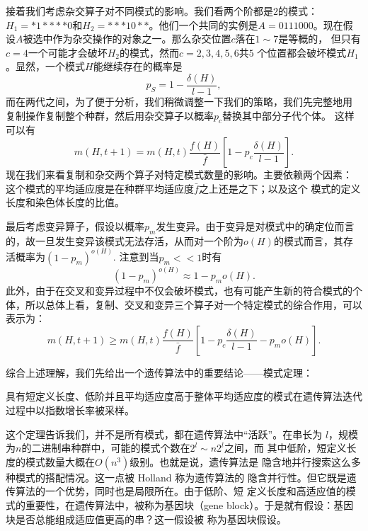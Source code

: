 接着我们考虑杂交算子对不同模式的影响。我们看两个阶都是$2$的模式：$H_1
= *1****0$和$H_2 = ***10**$。他们一个共同的实例是$A = 0111000$。现在假
设$A$被选中作为杂交操作的对象之一。那么杂交位置$c$落在$1 \sim 7$是等概的，
但只有$c = 4$一个可能才会破坏$H_2$的模式，然而$c = 2, 3, 4, 5, 6$共$5$
个位置都会破坏模式$H_1$。显然，一个模式$H$能继续存在的概率是
\begin{equation}
  p_S = 1 - \frac{\delta(H)}{l - 1},
  \label{eq::GA_ps}
\end{equation}
而在两代之间，为了便于分析，我们稍微调整一下我们的策略，我们先完整地用
复制操作复制整个种群，然后用杂交算子以概率$p_c$替换其中部分子代个体。
这样可以有
\begin{equation}
  m(H, t + 1) = m(H, t) \frac{f(H)}{\bar{f}}\left[1 - p_c
    \frac{\delta(H)}{l - 1}\right].
\end{equation}
现在我们来看复制和杂交两个算子对特定模式数量的影响。主要依赖两个因素：
这个模式的平均适应度是在种群平均适应度$\bar{f}$之上还是之下；以及这个
模式的定义长度和染色体长度的比值。

最后考虑变异算子，假设以概率$p_m$发生变异。由于变异是对模式中的确定位而言的，故一旦发生变异该模式无法存活，从而对一个阶为$o(H)$的模式而言，其存活概率为$(1-p_m)^{o(H)}$. 注意到当$p_m<<1$时有
$$
(1 - p_m)^{o(H)} \approx 1 - p_m o(H).
$$
此外，由于在交叉和变异过程中不仅会破坏模式，也有可能产生新的符合模式的个体，所以总体上看，复制、交叉和变异三个算子对一个特定模式的综合作用，可以表示为：
\begin{equation}
  m(H, t + 1) \geq m(H, t)\frac{f(H)}{\bar{f}}
  \left[1 - p_c\frac{\delta(H)}{l - 1} - p_mo(H)\right].
  \label{eq::GA_model}
\end{equation}

综合上述理解，我们先给出一个遗传算法中的重要结论——模式定理：

\begin{theorem}
  具有短定义长度、低阶并且平均适应度高于整体平均适应度的模式在遗传算法迭代
  过程中以指数增长率被采样。
\end{theorem}

这个定理告诉我们，并不是所有模式，都在遗传算法中“活跃”。在串长为
$l$，规模为$n$的二进制串种群中，可能的模式个数在$2^l \sim n2^l$之间，而
其中低阶，短定义长度的模式数量大概在$O(n^3)$级别。也就是说，遗传算法是
隐含地并行搜索这么多种模式的搭配情况。这一点被 Holland 称为遗传算法的
隐含并行性。但它既是遗传算法的一个优势，同时也是局限所在。由于低阶、短
定义长度和高适应值的模式的重要性，在遗传算法中，被称为基因块（gene
  block）。于是就有假设：基因块是否总能组成适应值更高的串？这一假设被
称为基因块假设。

